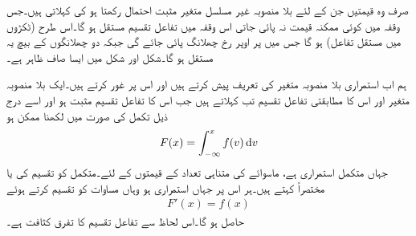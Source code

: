 صرف وہ  قیمتیں جن کے لئے بلا منصوبہ غیر مسلسل متغیر  مثبت احتمال رکھتا ہو  کی  کہلاتی ہیں۔جس وقفہ میں کوئی ممکنہ قیمت نہ پائی جاتی اس وقفہ میں تفاعل تقسیم  مستقل ہو گا۔اس طرح   (ٹکڑوں میں مستقل تفاعل) ہو گا جس میں  پر اوپر رخ  چھلانگ پائی جائے گی جبکہ دو چھلانگوں کے بیچ یہ مستقل ہو گا۔شکل  اور شکل  میں ایسا صاف ظاہر ہے۔

ہم اب استمراری بلا منصوبہ متغیر کی تعریف پیش کرتے ہیں اور اس پر غور کرتے ہیں۔ایک بلا منصوبہ متغیر  اور اس کا مطابقتی تفاعل تقسیم تب  کہلاتے ہیں جب اس کا تفاعل تقسیم  مثبت ہو اور اسے درج ذیل تکمل کی صورت میں لکھنا ممکن ہو
\begin{align}\label{مساوات_شماریات_استمراری_بلا_منصوبہ_متغیر_الف}
F(x)=\int_{-\infty}^{x} f(v)\dif v
\end{align}
جہاں متکمل استمراری ہے، ماسوائے   کی متناہی تعداد  کے قیمتوں کے لئے۔متکمل  کو تقسیم کی  یا مختصراً  کہتے ہیں۔ہر اس  پر جہاں  استمراری ہو وہاں مساوات  کو تقسیم کرتے ہوئے 
\begin{align*}
F'(x)=f(x)
\end{align*}
حاصل ہو گا۔اس لحاظ سے تفاعل تقسیم کا تفرق کثافت ہے۔

